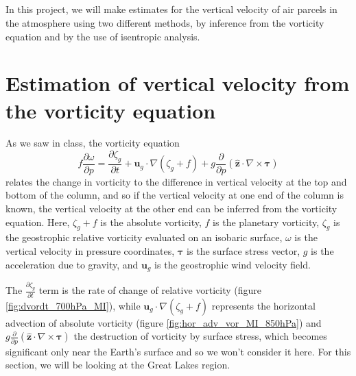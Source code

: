 \documentclass[11pt]{article}
\title{\spacedlowsmallcaps{\small 12.818: Introduction to Atmospheric Data and Large-scale Dynamics}\\ \spacedlowsmallcaps{\Large Project eight: Estimation of vertical velocity}}
\author{\spacedlowsmallcaps{Ali Ramadhan}}
\date{}
\newcommand\p[2]{\frac{\partial #1}{\partial #2}}
\begin{document}
\maketitle

In this project, we will make estimates for the vertical velocity of air parcels in the atmosphere using two different methods, by inference from the vorticity equation and by the use of isentropic analysis.

\section{Estimation of vertical velocity from the vorticity equation}
As we saw in class, the vorticity equation
\begin{equation} \label{eq:voreq}
  f \p{\omega}{p} = \p{\zeta_g}{t} + \bm{u}_g \cdot \nabla (\zeta_g + f) + g \p{}{p} (\hat{\bm{z}} \cdot \nabla \times \bm{\tau})
\end{equation}
relates the change in vorticity to the difference in vertical velocity at the top and bottom of the column, and so if the vertical velocity at one end of the column is known, the vertical velocity at the other end can be inferred from the vorticity equation. Here, $\zeta_g + f$ is the absolute vorticity, $f$ is the planetary vorticity, $\zeta_g$ is the geostrophic relative vorticity evaluated on an isobaric surface, $\omega$ is the vertical velocity in pressure coordinates, $\bm{\tau}$ is the surface stress vector, $g$ is the acceleration due to gravity, and $\bm{u}_g$ is the geostrophic wind velocity field.

The $\p{\zeta_g}{t}$ term is the rate of change of relative vorticity (figure \ref{fig:dvordt_700hPa_MI}), while $\bm{u}_g \cdot \nabla (\zeta_g + f)$ represents the horizontal advection of absolute vorticity (figure \ref{fig:hor_adv_vor_MI_850hPa}) and $g \p{}{p} (\hat{\bm{z}} \cdot \nabla \times \bm{\tau})$ the destruction of vorticity by surface stress, which becomes significant only near the Earth's surface and so we won't consider it here. For this section, we will be looking at the Great Lakes region.
\end{document}
